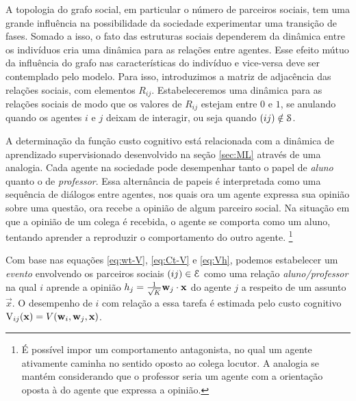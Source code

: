A topologia do grafo social, em particular o número de parceiros sociais, tem uma grande influência na possibilidade da sociedade experimentar uma transição de fases.
Somado a isso, o fato das estruturas sociais dependerem da dinâmica entre os indivíduos cria uma dinâmica para as relações entre agentes.
Esse efeito mútuo da influência do grafo nas características do indivíduo e vice-versa deve ser contemplado pelo modelo.
Para isso, introduzimos a matriz de adjacência das relações sociais, com elementos $R_{ij}$.
Estabeleceremos uma dinâmica para as relações sociais de modo que os valores de $R_{ij}$ estejam entre $0$ e $1$, se anulando quando os agentes $i$ e $j$ deixam de interagir, ou seja quando $(ij) \notin \mathcal{S}$.

A determinação da função custo cognitivo está relacionada com a dinâmica de aprendizado supervisionado desenvolvido na seção \ref{sec:ML} através de uma analogia. Cada agente na sociedade pode desempenhar tanto o papel de \emph{ aluno} quanto o de \emph{professor}.
Essa alternância de papeis é interpretada como uma sequência de diálogos entre agentes, nos quais ora um agente expressa sua opinião sobre uma questão, ora recebe a opinião de algum parceiro social.
Na situação em que a opinião de um colega é recebida, o agente se comporta como um aluno, tentando aprender a reproduzir o comportamento do outro agente. \footnote{É possível impor um comportamento antagonista, no qual um agente ativamente caminha no sentido oposto ao colega locutor.
A analogia se mantém considerando que o professor seria um agente com a orientação oposta à do agente que expressa a opinião.}

Com base nas equações \eqref{eq:wt-V}, \eqref{eq:Ct-V} e \eqref{eq:Vh}, podemos estabelecer um \emph{evento} envolvendo os parceiros sociais $(ij) \in \mathcal{E}$ como uma relação \emph{aluno/professor} na qual $i$ aprende a opinião $h_j =  {1\over \sqrt{K}} \mathbf{w}_{j} \cdot \mathbf{\mathbf{x}}$ do agente $j$ a respeito de um assunto $\vec{x}$.
O desempenho de $i$ com relação a essa tarefa é estimada pelo custo cognitivo ${\mathrm{V}}_{ij}(\mathbf{x}) = V(\mathbf{w}_{i},\mathbf{w}_{j},\mathbf{x})$.

